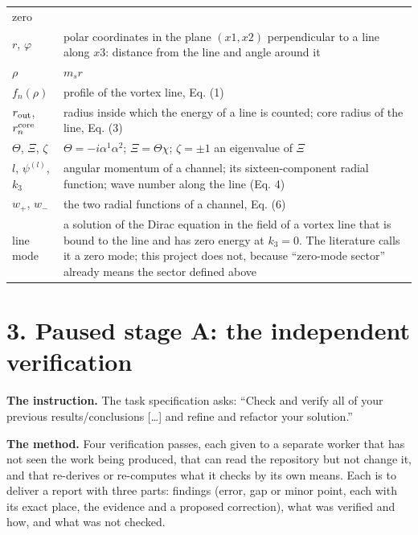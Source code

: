 \documentclass[
  10pt,
]{article}
\begin{document}
\begin{longtable}[]{@{}
  >{\raggedright\arraybackslash}p{}
  >{\raggedright\arraybackslash}p{}@{}}
zero \\
\(r\), \(\varphi\) & polar coordinates in the plane \((x1,x2)\)
perpendicular to a line along \(x3\): distance from the line and angle
around it \\
\(\rho\) & \(m_sr\) \\
\(f_n(\rho)\) & profile of the vortex line, Eq. (1) \\
\(r_{\rm out}\), \(r^{\rm core}_n\) & radius inside which the energy of
a line is counted; core radius of the line, Eq. (3) \\
\(\Theta\), \(\Xi\), \(\zeta\) & \(\Theta=-i\alpha^1\alpha^2\);
\(\Xi=\Theta\chi\); \(\zeta=\pm1\) an eigenvalue of \(\Xi\) \\
\(l\), \(\psi^{(l)}\), \(k_3\) & angular momentum of a channel; its
sixteen-component radial function; wave number along the line (Eq. 4) \\
\(w_+\), \(w_-\) & the two radial functions of a channel, Eq. (6) \\
line mode & a solution of the Dirac equation in the field of a vortex
line that is bound to the line and has zero energy at \(k_3=0\). The
literature calls it a zero mode; this project does not, because
``zero-mode sector'' already means the sector defined above \\
\end{longtable}

\hypertarget{paused-stage-a-the-independent-verification}{%
\section{3. Paused stage A: the independent
verification}\label{paused-stage-a-the-independent-verification}}

\textbf{The instruction.} The task specification asks: ``Check and
verify all of your previous results/conclusions {[}\ldots{]} and refine
and refactor your solution.''

\textbf{The method.} Four verification passes, each given to a separate
worker that has not seen the work being produced, that can read the
repository but not change it, and that re-derives or re-computes what it
checks by its own means. Each is to deliver a report with three parts:
findings (error, gap or minor point, each with its exact place, the
evidence and a proposed correction), what was verified and how, and what
was not checked.
\end{document}
